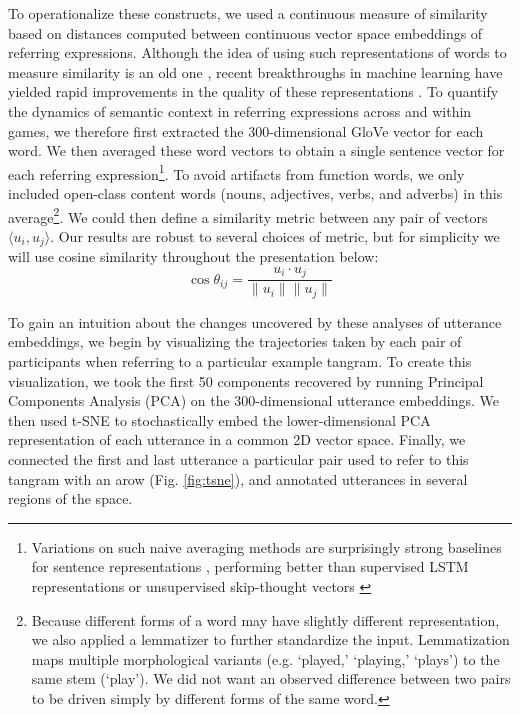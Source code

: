 \documentclass[alpha-refs]{wiley-article}
\begin{document}
To operationalize these constructs, we used a continuous measure of similarity based on distances computed between continuous vector space embeddings of referring expressions.
Although the idea of using such representations of words to measure similarity is an old one \citep{osgood1952nature,landauer_solution_1997,bengio_neural_2003}, recent breakthroughs in machine learning have yielded rapid improvements in the quality of these representations \citep[e.g.][]{mikolov2013distributed,pennington2014glove}.
To quantify the dynamics of semantic context in referring expressions across and within games, we therefore first extracted the 300-dimensional GloVe vector for each word. 
We then averaged these word vectors to obtain a single sentence vector for each referring expression\footnote{Variations on such naive averaging methods are surprisingly strong baselines for sentence representations \citep{arora2017asimple}, performing better than supervised LSTM representations or unsupervised skip-thought vectors \citep{KirosEtAl15_SkipThought}}.
To avoid artifacts from function words, we only included open-class content words (nouns, adjectives, verbs, and adverbs) in this average\footnote{Because different forms of a word may have slightly different representation, we also applied a lemmatizer to further standardize the input. Lemmatization maps multiple morphological variants (e.g. `played,' `playing,' `plays') to the same stem (`play'). We did not want an observed difference between two pairs to be driven simply by different forms of the same word.}.
We could then define a similarity metric between any pair of vectors $\langle u_i, u_j \rangle$.
Our results are robust to several choices of metric, but for simplicity we will use cosine similarity throughout the presentation below: $$\cos \theta_{ij} = \frac{u_i \cdot u_j}{\| u_i\| \| u_j \|}$$

To gain an intuition about the changes uncovered by these analyses of utterance embeddings, we begin by visualizing the trajectories taken by each pair of participants when referring to a particular example tangram.
To create this visualization, we took the first 50 components recovered by running Principal Components Analysis (PCA) on the 300-dimensional utterance embeddings. 
We then used t-SNE \citep{maaten2008visualizing} to stochastically embed the lower-dimensional PCA representation of each utterance in a common 2D vector space. 
Finally, we connected the first and last utterance a particular pair used to refer to this tangram with an arow (Fig. \ref{fig:tsne}), and annotated utterances in several regions of the space.
\end{document}
